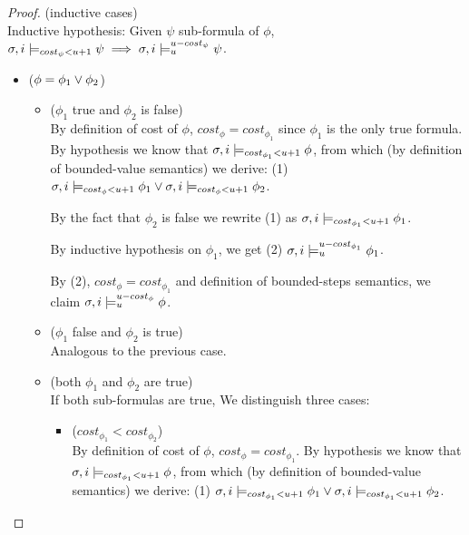 \begin{theorem}
\begin{lemma}
\begin{proof}
\noindent (inductive cases) \\
\noindent Inductive hypothesis: Given $\psi$ sub-formula of $\phi$, $\sigma,i \models_{cost_\psi < u + 1} \psi \implies \sigma,i \models_{u}^{u-cost_\psi} \psi$.
\begin{itemize}
    \item ($\phi = \phi_1 \lor \phi_2$)
    \begin{itemize}
        \item ($\phi_1$ true and $\phi_2$ is false) \\
        By definition of cost of $\phi$, $cost_\phi = cost_{\phi_1}$ since $\phi_1$ is the only true formula.
        By hypothesis we know that $\sigma,i \models_{cost_{\phi_1} < u + 1} \phi$, from which (by definition of bounded-value semantics) we derive: (1) $\sigma,i \models_{cost_\phi < u + 1} \phi_1 \lor \sigma,i \models_{cost_\phi < u + 1} \phi_2$.

        By the fact that $\phi_2$ is false we rewrite (1) as $\sigma,i \models_{cost_{\phi_1} < u + 1} \phi_1$.

        By inductive hypothesis on $\phi_1$, we get (2) $\sigma,i \models_{u}^{u-cost_{\phi_1}} \phi_1$.

        By (2), $cost_\phi = cost_{\phi_1}$ and definition of bounded-steps semantics, we claim $\sigma,i \models_{u}^{u-cost_\phi} \phi$.

        \item ($\phi_1$ false and $\phi_2$ is true) \\
        Analogous to the previous case.

        \item (both $\phi_1$ and $\phi_2$ are true) \\
        If both sub-formulas are true, We distinguish three cases:
        \begin{itemize}
            \item ($cost_{\phi_1} < cost_{\phi_2}$) \\
            By definition of cost of $\phi$, $cost_\phi = cost_{\phi_1}$.
            By hypothesis we know that $\sigma,i \models_{cost_{\phi_1} < u + 1} \phi$, from which (by definition of bounded-value semantics) we derive: 
            (1) $\sigma,i \models_{cost_{\phi_1} < u + 1} \phi_1 \lor \sigma,i \models_{cost_{\phi_1} < u + 1} \phi_2$.


\end{itemize}
\end{itemize}
\end{itemize}
\end{proof}
\end{lemma}
\end{theorem}

